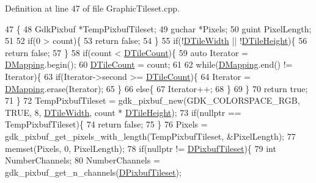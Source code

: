 Definition at line 47 of file Graphic\+Tileset.\+cpp.


\begin{DoxyCode}
47                                        \{
48     GdkPixbuf *TempPixbufTileset;
49     guchar *Pixels;
50     guint PixelLength;
51     
52     \textcolor{keywordflow}{if}(0 > count)\{
53         \textcolor{keywordflow}{return} \textcolor{keyword}{false};   
54     \}
55     \textcolor{keywordflow}{if}(!\hyperlink{classCGraphicTileset_a2d0c7d19865b81911a3a43d5cae50e00}{DTileWidth} || !\hyperlink{classCGraphicTileset_af48f32e07d5fe69afd5f764318cc3244}{DTileHeight})\{
56         \textcolor{keywordflow}{return} \textcolor{keyword}{false};
57     \}
58     \textcolor{keywordflow}{if}(count < \hyperlink{classCGraphicTileset_a39d942b370e47f441bf97385eb1037c8}{DTileCount})\{
59         \textcolor{keyword}{auto} Iterator = \hyperlink{classCGraphicTileset_a17cd13f68f77ea4976b59b37b10e914b}{DMapping}.begin();
60         \hyperlink{classCGraphicTileset_a39d942b370e47f441bf97385eb1037c8}{DTileCount} = count;
61         
62         \textcolor{keywordflow}{while}(\hyperlink{classCGraphicTileset_a17cd13f68f77ea4976b59b37b10e914b}{DMapping}.end() != Iterator)\{
63             \textcolor{keywordflow}{if}(Iterator->second >= \hyperlink{classCGraphicTileset_a39d942b370e47f441bf97385eb1037c8}{DTileCount})\{
64                 Iterator = \hyperlink{classCGraphicTileset_a17cd13f68f77ea4976b59b37b10e914b}{DMapping}.erase(Iterator);
65             \}
66             \textcolor{keywordflow}{else}\{
67                 Iterator++;   
68             \}
69         \}
70         \textcolor{keywordflow}{return} \textcolor{keyword}{true};
71     \}
72     TempPixbufTileset = gdk\_pixbuf\_new(GDK\_COLORSPACE\_RGB, TRUE, 8, \hyperlink{classCGraphicTileset_a2d0c7d19865b81911a3a43d5cae50e00}{DTileWidth}, count * 
      \hyperlink{classCGraphicTileset_af48f32e07d5fe69afd5f764318cc3244}{DTileHeight});
73     \textcolor{keywordflow}{if}(\textcolor{keyword}{nullptr} == TempPixbufTileset)\{
74         \textcolor{keywordflow}{return} \textcolor{keyword}{false};   
75     \}
76     Pixels = gdk\_pixbuf\_get\_pixels\_with\_length(TempPixbufTileset, &PixelLength);
77     memset(Pixels, 0, PixelLength);
78     \textcolor{keywordflow}{if}(\textcolor{keyword}{nullptr} != \hyperlink{classCGraphicTileset_a5d5adfcdbb347a6df3f57535ca08e3ef}{DPixbufTileset})\{
79         \textcolor{keywordtype}{int} NumberChannels;
80         NumberChannels = gdk\_pixbuf\_get\_n\_channels(\hyperlink{classCGraphicTileset_a5d5adfcdbb347a6df3f57535ca08e3ef}{DPixbufTileset});

\end{DoxyCode}
